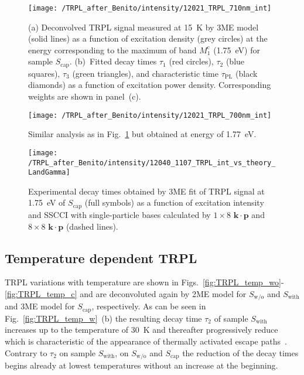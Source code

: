 \begin{figure}
	\centering
	\texttt{[image: /TRPL\_after\_Benito/intensity/12021\_TRPL\_710nm\_int]}
	\caption{(a) Deconvolved TRPL signal measured at 15~K by 3ME model (solid lines) as a function of excitation density (grey circles) at the energy corresponding to the maximum of band $M_1^\mathrm{c}$ (1.75~eV) for sample $S_\mathrm{cap}$. (b)~Fitted decay times $\tau_1$ (red circles), $\tau_2$ (blue squares), $\tau_3$ (green triangles), and characteristic time $\tau_\mathrm{PL}$ (black diamonds) as a function of excitation power density. Corresponding weights are shown in panel~(c).}
	\label{fig:TRPL_int_c}
\end{figure}

\begin{figure}
	\centering
	\texttt{[image: /TRPL\_after\_Benito/intensity/12021\_TRPL\_700nm\_int]}
	\caption{Similar analysis as in Fig.~\ref{fig:TRPL_int_c} but obtained at energy of 1.77~eV.}
	\label{fig:TRPL_int_c_L}
\end{figure}

\begin{figure}
	\centering
	\texttt{[image: /TRPL\_after\_Benito/intensity/12040\_1107\_TRPL\_int\_vs\_theory\_LandGamma]}
	\caption{Experimental decay times obtained by 3ME fit of TRPL signal at 1.75~eV of $S_\mathrm{cap}$ (full symbols) as a function of excitation intensity and SSCCI with single-particle bases calculated by $1\times8$ $\mathbf{k\cdot p}$ and $8\times8$ $\mathbf{k\cdot p}$ (dashed lines).}
	\label{fig:TRPL_int_c_theory}
\end{figure}






\clearpage
\subsection{Temperature dependent TRPL}
\label{chap:TRPL_temp}
%
TRPL variations with temperature are shown in Figs.~\ref{fig:TRPL_temp_wo}-\ref{fig:TRPL_temp_c} and are deconvoluted again by 2ME model for $S_\mathrm{w/o}$ and $S_\mathrm{with}$ and 3ME model for $S_\mathrm{cap}$, respectively. As can be seen in Fig.~\ref{fig:TRPL_temp_w}~(b) the resulting decay time $\tau_2$ of sample $S_\mathrm{with}$ increases up to the temperature of 30~K and thereafter progressively reduce which is characteristic of the appearance of thermally activated escape paths~\citep{Manna_apl2012_TRPLtype2}. Contrary to $\tau_2$ on sample $S_\mathrm{with}$, on $S_\mathrm{w/o}$ and $S_\mathrm{cap}$ the reduction of the decay times begins already at lowest temperatures without an increase at the beginning.

